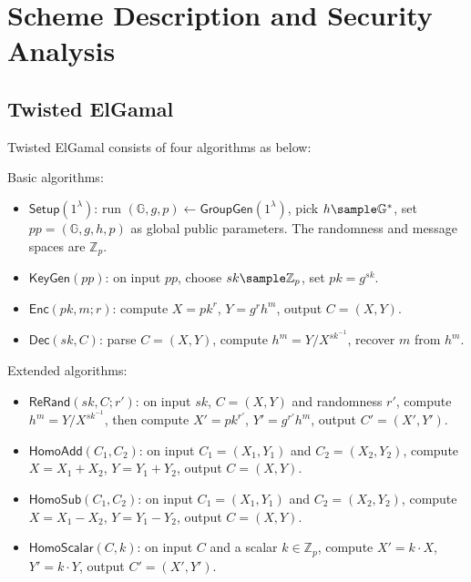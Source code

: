 \documentclass[a4paper,10pt]{article}
\begin{document}
\section{Scheme Description and Security Analysis}
\subsection{Twisted ElGamal} 
Twisted ElGamal consists of four algorithms as below: 

\begin{trivlist}
\item Basic algorithms:
\begin{itemize} \itemsep 1pt \parskip 0pt \parsep 0pt
\item $\mathsf{Setup}(1^\lambda)$: run $(\mathbb{G}, g, p) \leftarrow \mathsf{GroupGen}(1^\lambda)$, 
    pick $h \sample \mathbb{G}^*$, set $pp = (\mathbb{G}, g, h, p)$ as global public parameters. 
    The randomness and message spaces are $\mathbb{Z}_p$. 

\item $\mathsf{KeyGen}(pp)$: on input $pp$, choose $sk \sample \mathbb{Z}_p$, set $pk = g^{sk}$. 

\item $\mathsf{Enc}(pk, m; r)$: compute $X = pk^r$, $Y = g^r h^m$, output $C = (X, Y)$. 

\item $\mathsf{Dec}(sk, C)$: parse $C = (X, Y)$, compute $h^m = Y/X^{sk^{-1}}$, recover $m$ from $h^m$. 
\end{itemize} 

\item Extended algorithms:
\begin{itemize} \itemsep 1pt \parskip 0pt \parsep 0pt
    \item $\mathsf{ReRand}(sk, C; r')$: on input $sk$, $C = (X, Y)$ and randomness $r'$, 
        compute $h^m = Y/X^{sk^{-1}}$, then compute $X' = pk^{r'}$, $Y' = g^{r'}h^m$, output $C' = (X', Y')$. 

    \item $\mathsf{HomoAdd}(C_1, C_2)$: on input $C_1 = (X_1, Y_1)$ and $C_2 = (X_2, Y_2)$, 
        compute $X = X_1+X_2$, $Y = Y_1+Y_2$, output $C = (X, Y)$.  

    \item $\mathsf{HomoSub}(C_1, C_2)$: on input $C_1 = (X_1, Y_1)$ and $C_2 = (X_2, Y_2)$, 
        compute $X = X_1-X_2$, $Y = Y_1-Y_2$, output $C = (X, Y)$.  

    \item $\mathsf{HomoScalar}(C, k)$: on input $C$ and a scalar $k \in \mathbb{Z}_p$, 
        compute $X' = k \cdot X$, $Y' = k \cdot Y$, output $C' = (X', Y')$.  
\end{itemize}
\end{trivlist}
\end{document}
